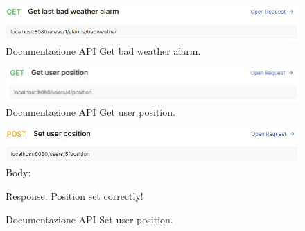 \begin{figure}[h!]
	\centering
	\includegraphics[width=1\linewidth]{./Iterazione 3/ImageFiles/GetBadWeatherAlarmRequest}
	
	\caption{Documentazione API Get bad weather alarm.}
	\label{fig:GetBadWeatherAlarm}
\end{figure}

\begin{figure}[h!]
	\centering
	\includegraphics[width=1\linewidth]{./Iterazione 3/ImageFiles/GetUserPositionRequest}
	
	\caption{Documentazione API Get user position.}
	\label{fig:GetUserPosition}
\end{figure}

\begin{figure}[h!]
	\centering
	\includegraphics[width=1\linewidth]{./Iterazione 3/ImageFiles/SetUserPositionRequest}
	Body:
	
	Response:
	Position set correctly!
	\caption{Documentazione API Set user position.}
	\label{fig:SetUserPosition}
\end{figure}

\clearpage



